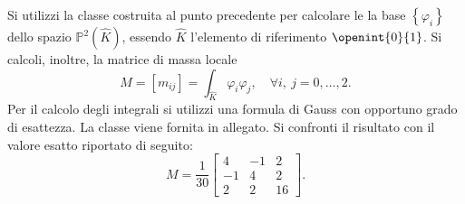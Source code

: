 Si utilizzi la classe costruita al punto precedente per calcolare le
la base $\left\lbrace\varphi_i\right\rbrace$ dello spazio
$\mathbb{P}^2(\hat{K})$, essendo $\hat{K}$ l'elemento di riferimento 
$\openint{0}{1}$. Si calcoli, inoltre, la matrice di massa locale
\begin{equation*}
M = [m_{ij}] = \int_{\hat{K}} \varphi_i \varphi_j ,\quad\forall i,~j =
0,\ldots, 2.
\end{equation*}
Per il calcolo degli integrali si utilizzi una formula di Gauss con
opportuno grado di esattezza. La classe  viene fornita in
allegato. Si confronti il risultato con il valore esatto riportato di
seguito:
\begin{equation*}
M = \frac{1}{30}\left[\begin{array}{ccc}
4 &  -1 & 2 \\
-1 & 4 & 2 \\
2 & 2 & 16
\end{array}\right].
\end{equation*}
